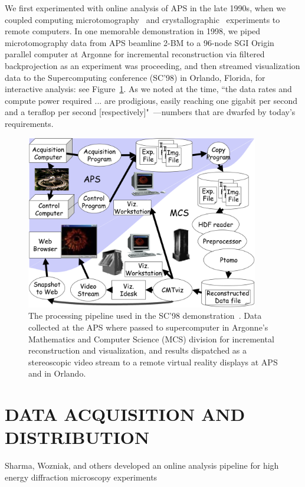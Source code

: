 \documentclass{aip-cp}
\begin{document}
We first experimented with online analysis of APS in the late 1990s, 
when we coupled 
computing microtomography~\cite{wang1999quasi,wang2001high} and crystallographic~\cite{von2000using}
experiments to remote computers.
In one memorable demonstration in 1998, we piped microtomography data from APS beamline 2-BM to a 96-node SGI Origin parallel computer 
at Argonne for incremental reconstruction via filtered backprojection as an experiment was proceeding,
and then streamed visualization data to the Supercomputing conference (SC'98) in Orlando, Florida, 
for interactive analysis: see Figure~\ref{fig:sc98}. 
As we noted at the time, 
``the data rates and compute power required ... are prodigious, easily reaching one gigabit per second and a teraflop per second [respectively]"~\cite{von2000real}---numbers that are dwarfed by today's requirements. 

\begin{figure}[h]
  \centerline{\includegraphics[width=4in]{Figs/APS-Fig.png}}
  \caption{The processing pipeline used in the SC'98 demonstration~\cite{von2000real}. Data collected at the APS 
  where passed to supercomputer in Argonne's Mathematics and Computer Science (MCS) division for
  incremental reconstruction and visualization, and results dispatched as a stereoscopic
  video stream to a remote virtual reality displays at APS and in Orlando.\label{fig:sc98}}
\end{figure}

\section{DATA ACQUISITION AND DISTRIBUTION}

Sharma, Wozniak, and others developed an online analysis pipeline for high energy diffraction microscopy
experiments 
\end{document}
